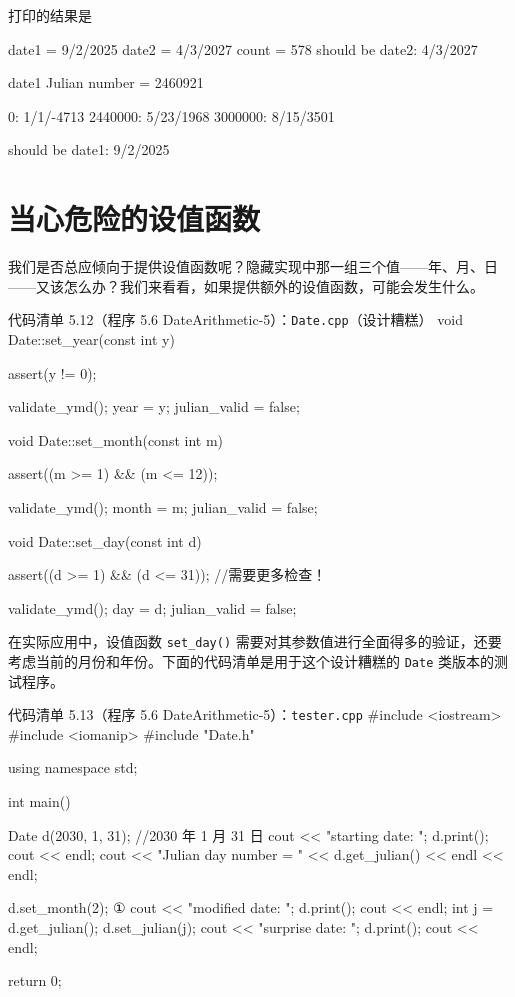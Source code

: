 打印的结果是

\begin{codebox}
date1 = 9/2/2025
date2 = 4/3/2027
count = 578
should be date2: 4/3/2027

date1 Julian number = 2460921

       0: 1/1/-4713
 2440000: 5/23/1968
 3000000: 8/15/3501

should be date1: 9/2/2025
\end{codebox}

\section{当心危险的设值函数}

我们是否总应倾向于提供设值函数呢？隐藏实现中那一组三个值——年、月、日——又该怎么办？我们来看看，如果提供额外的设值函数，可能会发生什么。

\begin{codeboxt}{代码清单 5.12（程序 5.6 DateArithmetic-5）：\texttt{Date.cpp}（设计糟糕）}
void Date::set_year(const int y)
{
    assert(y != 0);

    validate_ymd();
    year = y;
    julian_valid = false;
}

void Date::set_month(const int m)
{
    assert((m >= 1) && (m <= 12));

    validate_ymd();
    month = m;
    julian_valid = false;
}

void Date::set_day(const int d)
{
    assert((d >= 1) && (d <= 31));  //需要更多检查！

    validate_ymd();
    day = d;
    julian_valid = false;
}
\end{codeboxt}

在实际应用中，设值函数 \texttt{set\_\allowbreak{}day(\allowbreak{})\allowbreak{}} 需要对其参数值进行全面得多的验证，还要考虑当前的月份和年份。下面的代码清单是用于这个设计糟糕的 \texttt{Date} 类版本的测试程序。

\begin{codeboxt}{代码清单 5.13（程序 5.6 DateArithmetic-5）：\texttt{tester.\allowbreak{}cpp}}
#include <iostream>
#include <iomanip>
#include "Date.h"

using namespace std;

int main()
{
    Date d(2030, 1, 31);  //2030 年 1 月 31 日
    cout << "starting date: "; d.print(); cout << endl;
    cout << "Julian day number = " << d.get_julian() << endl << endl;

    d.set_month(2);                                 ①
    cout << "modified date: "; d.print(); cout << endl;
    int j = d.get_julian();
    d.set_julian(j);
    cout << "surprise date: "; d.print(); cout << endl;

    return 0;
}
\end{codeboxt}
\par


